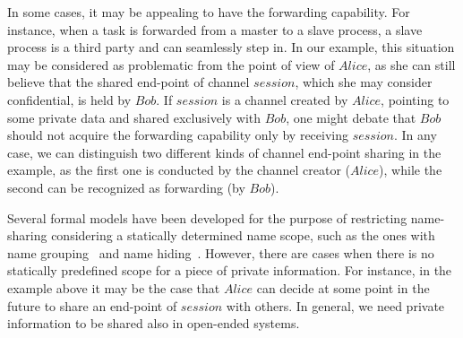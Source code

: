 In some cases, it may be appealing to have the forwarding capability. For instance, when a task is forwarded from a master to a slave process, a slave process is a third party and can seamlessly step in.
In our example, this situation may be considered as problematic from the point of view of $\mathit{Alice}$, as she can still believe that the shared end-point of channel $\mathit{session}$, which she may consider confidential, is held by $\mathit{Bob}$. 
If $\mathit{session}$ is a channel created by $\mathit{Alice}$, %
pointing to some private data %
and shared exclusively with $\mathit{Bob}$, %
one might debate that $\mathit{Bob}$ should not acquire the forwarding capability %
only by receiving $\mathit{session}$. 
In any case, we can distinguish
two different kinds of channel end-point sharing in the example, as the first one is conducted by the channel creator ($\mathit{Alice}$), while the second can be recognized as forwarding (by $\mathit{Bob}$).

Several formal models have been developed for the purpose of restricting name-sharing considering a statically determined name scope, such as the ones with name grouping~\cite{cardelli05} and name hiding~\cite{Giunti}. 
However, there are cases when there is no statically predefined scope for a piece of private information. For instance, in the example above it may be the case that $\mathit{Alice}$ can decide at some point in the future to share an end-point of $\mathit{session}$ with others. 
In general, we need private information to be shared also in open-ended systems.

